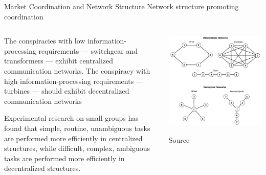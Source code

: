 \documentclass[notes, aspectratio=1610]{beamer}
\begin{document}
\begin{frame}{Market Coordination and Network Structure}
	{Network structure promoting coordination}

	\small

	\begin{columns}
			\begin{column}{0.5\textwidth}

		\begin{tcolorbox}[
			colback=base_c!5!white,
			colframe=base_c!90!black,
			title={\centering Proposition 2}]
			\footnotesize The conspiracies with low information-processing 
			requirements --- switchgear and transformers --- 
			exhibit centralized communication networks.
			The conspiracy with high information-processing
			requirements --- turbines --- should exhibit decentralized
			communication networks \end{tcolorbox}

		\begin{tcolorbox}[
			colback=comp_c!5!white,
			colframe=comp_c!90!black,
			title={\centering \small Argument for Proposition 2}]
			\footnotesize Experimental research on small groups has found that 
			simple, routine, unambiguous tasks are performed more 
			efficiently in centralized structures, while difficult, 
			complex, ambiguous tasks are performed more efficiently 
			in decentralized structures.
		\end{tcolorbox}

		\end{column}

		\begin{column}{0.5\textwidth}
			\includegraphics[width=1\textwidth]{images/centralization}

			\raggedleft Source~\cite[][page 849]{baker_faulkner_1993}
		\end{column}

	\end{columns}
\end{frame}
\end{document}
